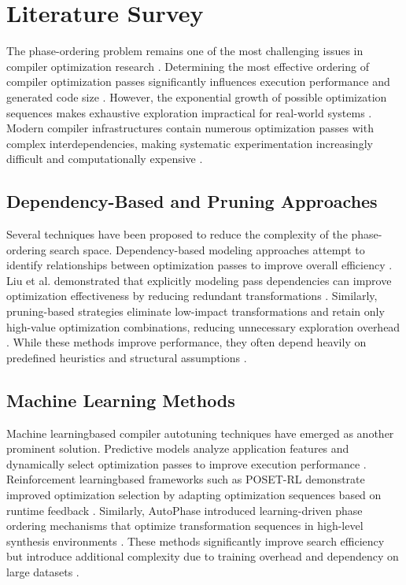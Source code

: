 \documentclass[conference]{IEEEtran}
\begin{document}

\section{Literature Survey}

The phase-ordering problem remains one of the most challenging issues in compiler optimization research \cite{ref1}. Determining the most effective ordering of compiler optimization passes significantly influences execution performance and generated code size \cite{ref2}. However, the exponential growth of possible optimization sequences makes exhaustive exploration impractical for real-world systems \cite{ref19}. Modern compiler infrastructures contain numerous optimization passes with complex interdependencies, making systematic experimentation increasingly difficult and computationally expensive \cite{ref1}.

\subsection{Dependency-Based and Pruning Approaches}
Several techniques have been proposed to reduce the complexity of the phase-ordering search space. Dependency-based modeling approaches attempt to identify relationships between optimization passes to improve overall efficiency \cite{ref1}. Liu et al. demonstrated that explicitly modeling pass dependencies can improve optimization effectiveness by reducing redundant transformations \cite{ref1}. Similarly, pruning-based strategies eliminate low-impact transformations and retain only high-value optimization combinations, reducing unnecessary exploration overhead \cite{ref4}. While these methods improve performance, they often depend heavily on predefined heuristics and structural assumptions \cite{ref19}.

\subsection{Machine Learning Methods}
Machine learning\textendash based compiler autotuning techniques have emerged as another prominent solution. Predictive models analyze application features and dynamically select optimization passes to improve execution performance \cite{ref8}. Reinforcement learning\textendash based frameworks such as POSET-RL demonstrate improved optimization selection by adapting optimization sequences based on runtime feedback \cite{ref8}. Similarly, AutoPhase introduced learning-driven phase ordering mechanisms that optimize transformation sequences in high-level synthesis environments \cite{ref12}. These methods significantly improve search efficiency but introduce additional complexity due to training overhead and dependency on large datasets \cite{ref12}.
\end{document}
